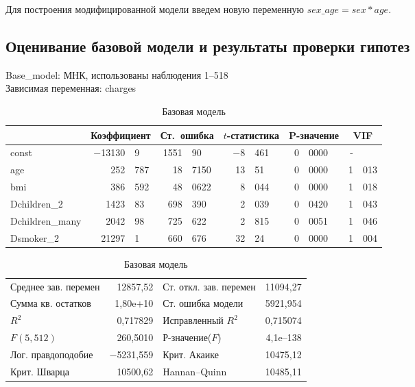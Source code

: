 \documentclass[a4paper,12pt]{article}
\begin{document}
Для построения модифицированной модели введем новую переменную $sex\_age = sex * age$.

\subsection{Оценивание базовой модели и результаты проверки гипотез}
\begin{table}[H]
	\begin{center}	
		Base\_model:
		МНК, использованы наблюдения 1--518\\
		Зависимая переменная: charges\\
		\vspace{1em}
		\begin{tabular}{|l|r@{,}l|r@{,}l|r@{,}l|r@{,}l|r@{,}l|}
			\hline
			&
			\multicolumn{2}{c|}{Коэффициент} &
			\multicolumn{2}{c|}{Ст.\ ошибка} &
			\multicolumn{2}{c|}{$t$-статистика} &
			\multicolumn{2}{c|}{P-значение} &
			\multicolumn{2}{c|}{VIF} \\[1ex]
			\hline
			const &	$-$13130&9 & 1551&90 & $-$8&461 & 0&0000 & -& \\
			\hline
			age & 252&787 &	18&7150 & 13&51 & 0&0000 & 1&013 \\
			\hline
			bmi & 386&592 &	48&0622 & 8&044 & 0&0000 & 1&018 \\
			\hline
			Dchildren\_2 & 1423&83 & 698&390 & 2&039 & 0&0420 & 1&043 \\
			\hline
			Dchildren\_many & 2042&98 & 725&622 & 2&815 & 0&0051 & 1&046 \\
			\hline
			Dsmoker\_2 & 21297&1 & 660&676 & 32&24 & 0&0000 & 1&004 \\
			\hline
		\end{tabular}	
		\vspace{1ex}
		\begin{tabular}{lrlr}
			Среднее зав. перемен &  12857,52 & Ст. откл. зав. перемен &  11094,27 \\
			Сумма кв. остатков &  1,80\textrm{e+10} & Ст. ошибка модели &  5921,954 \\
			$R^2$ &  0,717829 & Исправленный $R^2$ &  0,715074 \\
			$F(5, 512)$ &  260,5010 & Р-значение($F$) &  4,1\textrm{e--138} \\
			Лог. правдоподобие & $-$5231,559 & Крит. Акаике &  10475,12 \\
			Крит. Шварца &  10500,62 & Hannan--Quinn &  10485,11 \\
		\end{tabular}
		\caption{Базовая модель}
		\label{tab:base}	
	\end{center}
\end{table}
\end{document}
